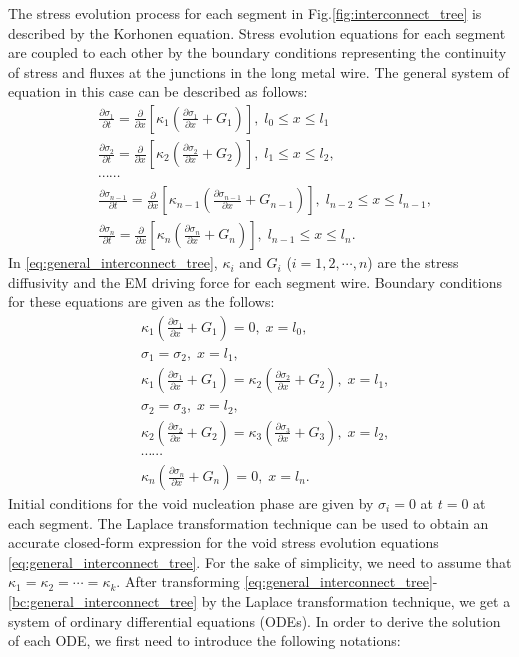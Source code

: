 The stress evolution process for each segment in Fig.\ref{fig:interconnect_tree} is described by the Korhonen equation. Stress evolution equations for each segment are coupled to each other by the boundary conditions representing the continuity of stress and fluxes at the junctions in the long metal wire. The general system of equation in this case can be described as follows:
\begin{equation} \label{eq:general_interconnect_tree}
\begin{split}
&\frac{\partial \sigma_1}{\partial t}=\frac{\partial }{\partial
x}[\kappa_1(\frac{\partial \sigma_1}{\partial x}+G_1)],\;l_0\leq x \leq l_1 \\
&\frac{\partial \sigma_2}{\partial t}=\frac{\partial }{\partial
x}[\kappa_2(\frac{\partial \sigma_2}{\partial
x}+G_2)],\;l_1\leq x \leq l_2, \\
&\cdots\cdots\\
&\frac{\partial \sigma_{n-1}}{\partial t}=\frac{\partial }{\partial
x}[\kappa_{n-1}(\frac{\partial \sigma_{n-1}}{\partial
x}+G_{n-1})],\;l_{n-2}\leq x \leq l_{n-1}, \\
&\frac{\partial \sigma_{n}}{\partial t}=\frac{\partial }{\partial
x}[\kappa_{n}(\frac{\partial \sigma_{n}}{\partial
x}+G_{n})],\;l_{n-1}\leq x \leq l_n.
 \end{split}
 \end{equation}
In \eqref{eq:general_interconnect_tree}, $\kappa_{i}$ and $G_i$ ($i=1,2,\cdots,n$) are the stress diffusivity and the EM driving force for each segment wire.  
Boundary conditions for these equations are given as the follows:
 \begin{equation} \label{bc:general_interconnect_tree}
\begin{split}
&\kappa_1(\frac{\partial \sigma_1}{\partial x}+G_1)=0,\;x=l_0,\\
&\sigma_1=\sigma_2,\;x=l_1,\\
&\kappa_1(\frac{\partial \sigma_1}{\partial
x}+G_1)=\kappa_2(\frac{\partial \sigma_2}{\partial
x}+G_2),\;x=l_1,\\
&\sigma_2=\sigma_3,\;x=l_2,\\
&\kappa_2(\frac{\partial \sigma_2}{\partial
x}+G_2)=\kappa_3(\frac{\partial \sigma_3}{\partial
x}+G_3),\;x=l_2,\\
&\cdots\cdots \\
&\kappa_n(\frac{\partial \sigma_n}{\partial
x}+G_n)=0,\;x=l_n.
 \end{split}
 \end{equation}
Initial conditions for the void nucleation phase are given by $\sigma_i=0$ at $t=0$ at each segment. The Laplace transformation technique can be used to obtain an accurate closed-form expression for the void stress evolution equations \eqref{eq:general_interconnect_tree}. For the sake of simplicity, we need to assume that $\kappa_1=\kappa_2=\cdots=\kappa_k$. After transforming \eqref{eq:general_interconnect_tree}-\eqref{bc:general_interconnect_tree} by the Laplace transformation technique, we get a system of ordinary differential equations (ODEs). In order to derive the solution of each ODE, we first need to introduce the following notations:

